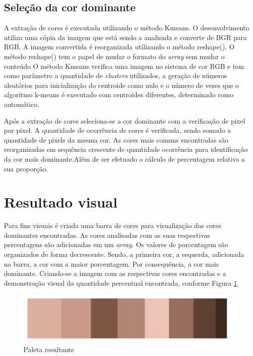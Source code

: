 \subsection{Seleção da cor dominante}
A extração de cores é executada utilizando o método Kmeans. O desenvolvimento utiliza uma cópia da imagem que está sendo a analisada e converte de BGR para RGB. A imagem convertida é reorganizada utilizando o método reshape(). O método reshape() tem o papel de mudar o formato do \textit{array} sem mudar o conteúdo
O método Kmeans verifica uma imagem no sistema de cor RGB e tem como parâmetro a quantidade de \textit{clusters} utilizados, a  geração de números aleatórios para inicialização do centroide como nulo e o número de vezes que o algoritmo k-means é executado com centroides diferentes, determinado como automático.

Após a extração de cores seleciona-se a cor dominante com a verificação de pixel por pixel. A quantidade de ocorrência de cores é verificada, sendo somado a quantidade de pixels da mesma cor. As cores mais comuns encontradas são reorganizadas em sequência crescente de quantidade ocorrência para identificação da cor mais dominante.Além de ser efetuado o cálculo de percentagem relativa a sua proporção.

 
\section{Resultado visual}
Para fins visuais é criada uma barra de cores para visualização das cores dominantes encontradas. As cores analisadas com as suas respectivas percentagens são adicionadas em um \textit{array}. Os valores de porcentagem são organizados de forma decrescente. Sendo, a primeira cor, a esquerda, adicionada na barra, a cor com a maior porcentagem. Por consequência, a cor mais dominante. Criando-se a imagem com as respectivas cores encontradas e a demonstração visual da quantidade percentual encontrada, conforme Figura \ref{fig:x Paleta_resultante}.  

\begin{figure}[h]
\centering
\caption{Paleta resultante}
\includegraphics{Template_Latex_TCC-UNIFTEC/_lib/imagens/paleta.png}

\label{fig:x Paleta_resultante}
\end{figure}


